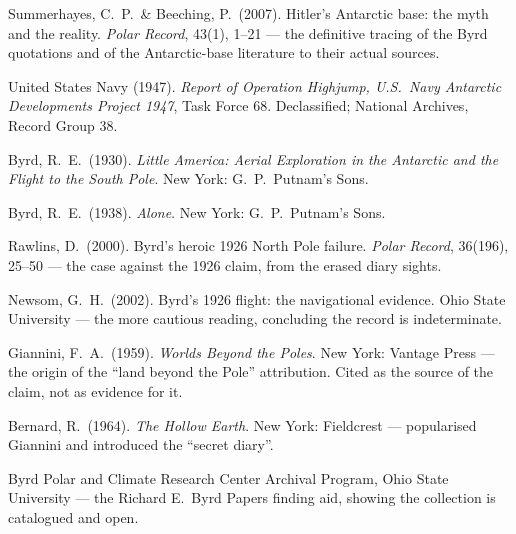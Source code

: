 \begin{srcnotes}
\item Summerhayes, C.\ P.\ \& Beeching, P.\ (2007). Hitler's Antarctic base: the myth and the reality.
\emph{Polar Record}, 43(1), 1--21 --- the definitive tracing of the Byrd quotations and of the
Antarctic-base literature to their actual sources.
\item United States Navy (1947). \emph{Report of Operation Highjump, U.S.\ Navy Antarctic
Developments Project 1947}, Task Force 68. Declassified; National Archives, Record Group 38.
\item Byrd, R.\ E.\ (1930). \emph{Little America: Aerial Exploration in the Antarctic and the Flight
to the South Pole}. New York: G.\ P.\ Putnam's Sons.
\item Byrd, R.\ E.\ (1938). \emph{Alone}. New York: G.\ P.\ Putnam's Sons.
\item Rawlins, D.\ (2000). Byrd's heroic 1926 North Pole failure. \emph{Polar Record}, 36(196),
25--50 --- the case against the 1926 claim, from the erased diary sights.
\item Newsom, G.\ H.\ (2002). Byrd's 1926 flight: the navigational evidence. Ohio State University
--- the more cautious reading, concluding the record is indeterminate.
\item Giannini, F.\ A.\ (1959). \emph{Worlds Beyond the Poles}. New York: Vantage Press --- the
origin of the ``land beyond the Pole'' attribution. Cited as the source of the claim, not as
evidence for it.
\item Bernard, R.\ (1964). \emph{The Hollow Earth}. New York: Fieldcrest --- popularised Giannini
and introduced the ``secret diary''.
\item Byrd Polar and Climate Research Center Archival Program, Ohio State University --- the Richard
E.\ Byrd Papers finding aid, showing the collection is catalogued and open.
\end{srcnotes}
